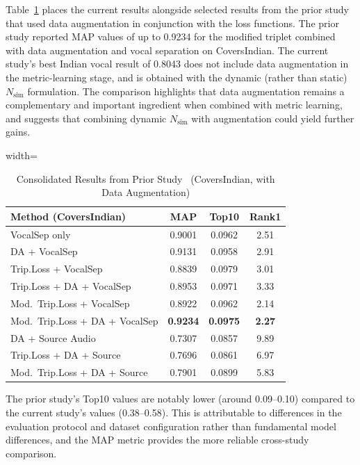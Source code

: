 \documentclass[conference]{IEEEtran}
\begin{document}
Table~\ref{tab:ismir_comparison} places the current results alongside selected results from the prior study~\cite{ismir_paper} that used data augmentation in conjunction with the loss functions. The prior study reported MAP values of up to 0.9234 for the modified triplet combined with data augmentation and vocal separation on CoversIndian. The current study's best Indian vocal result of 0.8043 does not include data augmentation in the metric-learning stage, and is obtained with the dynamic (rather than static) $N_{\text{sim}}$ formulation. The comparison highlights that data augmentation remains a complementary and important ingredient when combined with metric learning, and suggests that combining dynamic $N_{\text{sim}}$ with augmentation could yield further gains.

\begin{table}[htbp]
    \caption{Consolidated Results from Prior Study~\cite{ismir_paper} (CoversIndian, with Data Augmentation)}
    \label{tab:ismir_comparison}
    \centering
    \begin{adjustbox}{width=\columnwidth}
    \begin{tabular}{lccc}
    \toprule
    \textbf{Method (CoversIndian)} & \textbf{MAP} & \textbf{Top10} & \textbf{Rank1} \\
    \midrule
    VocalSep only & 0.9001 & 0.0962 & 2.51 \\
    DA + VocalSep & 0.9131 & 0.0958 & 2.91 \\
    Trip.Loss + VocalSep & 0.8839 & 0.0979 & 3.01 \\
    Trip.Loss + DA + VocalSep & 0.8953 & 0.0971 & 3.33 \\
    Mod.\ Trip.Loss + VocalSep & 0.8922 & 0.0962 & 2.14 \\
    Mod.\ Trip.Loss + DA + VocalSep & \textbf{0.9234} & \textbf{0.0975} & \textbf{2.27} \\
    \midrule
    DA + Source Audio & 0.7307 & 0.0857 & 9.89 \\
    Trip.Loss + DA + Source & 0.7696 & 0.0861 & 6.97 \\
    Mod.\ Trip.Loss + DA + Source & 0.7901 & 0.0899 & 5.83 \\
    \bottomrule
    \end{tabular}
    \end{adjustbox}
\end{table}

The prior study's Top10 values are notably lower (around 0.09--0.10) compared to the current study's values (0.38--0.58). This is attributable to differences in the evaluation protocol and dataset configuration rather than fundamental model differences, and the MAP metric provides the more reliable cross-study comparison.
\end{document}
